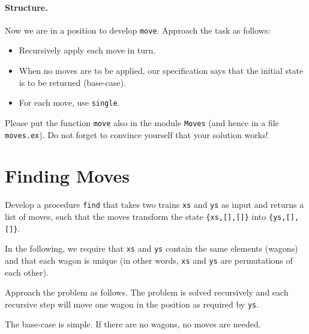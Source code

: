 \documentclass[a4paper,11pt]{article}
\begin{document}
\paragraph{Structure.}

Now we are in a position to develop \verb+move+. Approach the
task as follows:
\begin{itemize}

\item Recursively apply each move in turn.
  
\item When no moves are to be applied, our specification says
  that the initial state is to be returned (base-case).
  
\item For each move, use \verb+single+.
\end{itemize}

Please put the function \verb+move+ also in the module \verb+Moves+
(and hence in a file \verb+moves.ex+).  Do not forget to convince
yourself that your solution works!


\section{Finding Moves}

Develop a procedure \verb+find+ that takes two trains \verb+xs+
and \verb+ys+ as input and returns a list of moves, such that the
moves transform the state \verb+{xs,[],[]}+ into
\verb+{ys,[],[]}+.

In the following, we require that \verb+xs+ and \verb+ys+ contain the
same elements (wagons) and that each wagon is unique (in other
words, \verb+xs+ and \verb+ys+ are permutations of each other).

Approach the problem as follows. The problem is solved
recursively and each recursive step will move one wagon in the
position as required by \verb+ys+.

The base-case is simple. If there are no wagons, no moves are
needed.
\end{document}
